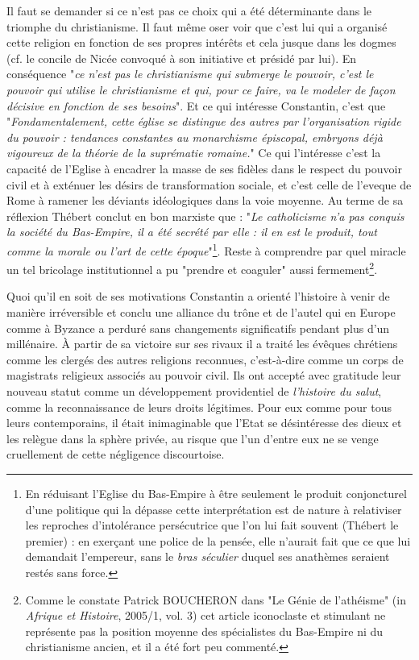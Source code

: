 Il faut se demander si ce n'est pas ce choix qui a été déterminante dans le triomphe  du christianisme. Il faut même oser voir que c'est lui qui a organisé cette religion en fonction de ses propres intérêts et cela jusque dans les dogmes (cf. le concile de Nicée convoqué à son initiative et présidé par lui). En conséquence "\emph{ce n'est pas le christianisme qui submerge le pouvoir, c'est le pouvoir qui utilise le christianisme et qui, pour ce faire, va le modeler de façon décisive en fonction de ses besoins}". Et ce qui intéresse Constantin, c'est que "\emph{Fondamentalement, cette église se distingue des autres par l'organisation rigide du pouvoir : tendances constantes au monarchisme épiscopal, embryons déjà vigoureux de la théorie de la suprématie romaine.}" Ce qui l'intéresse c'est la capacité de l'Eglise à encadrer la masse de ses fidèles dans le respect du pouvoir civil et à exténuer les désirs de transformation sociale, et c'est celle de l'eveque de Rome à ramener les déviants idéologiques dans la voie moyenne. Au terme de sa réflexion Thébert conclut en bon marxiste que : "\emph{Le catholicisme n'a pas conquis la société du Bas-Empire, il a été secrété par elle : il en est le produit, tout comme la morale ou l'art de cette époque}"\footnote{En réduisant l'Eglise du Bas-Empire à être seulement le produit conjoncturel d'une politique qui la dépasse cette interprétation est de nature à relativiser les reproches d'intolérance persécutrice que l'on lui fait souvent  (Thébert le premier) : en exerçant une police de la pensée, elle n'aurait fait que ce que lui demandait l'empereur, sans le \emph{bras séculier} duquel ses anathèmes seraient restés sans force.}. Reste à comprendre par quel miracle un tel bricolage institutionnel a pu "prendre et coaguler" aussi fermement\footnote{Comme le constate Patrick BOUCHERON  dans "Le Génie de l'athéisme" (in \emph{Afrique et Histoire}, 2005/1, vol. 3) cet article iconoclaste et stimulant ne représente pas la position moyenne des spécialistes du Bas-Empire ni du christianisme ancien, et il a été fort peu commenté.}.

Quoi qu'il en soit de ses motivations Constantin a orienté l'histoire à venir de manière irréversible et conclu une alliance du trône et de l'autel qui en Europe comme à Byzance a perduré sans changements significatifs pendant plus d'un millénaire. À partir de sa victoire sur ses rivaux il a traité les évêques chrétiens comme les clergés des autres religions reconnues, c'est-à-dire comme un corps de magistrats religieux associés au pouvoir civil. Ils ont accepté avec gratitude leur nouveau statut comme un développement providentiel de \emph{l'histoire du salut}, comme la reconnaissance de leurs droits légitimes. Pour eux comme pour tous leurs contemporains, il était inimaginable que l'Etat se désintéresse des dieux et les relègue dans la sphère privée, au risque que l'un d'entre eux ne se venge cruellement de cette négligence discourtoise. 
 
